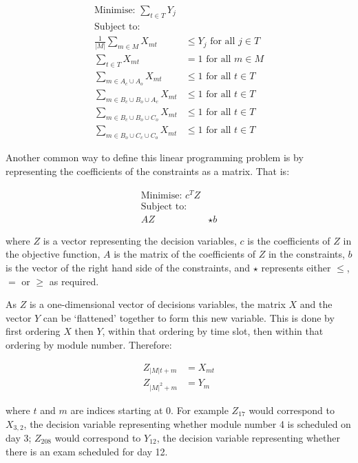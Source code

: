 \begin{align}
\text{Minimise: } \sum_{t \in T} Y_j & \label{eqn:objective_modules} \\
\text{Subject to: } & \nonumber \\
\frac{1}{|M|} \sum_{m \in M} X_{mt} &\leq Y_j \text{ for all } j \in T \label{eqn:auxiliary} \\
\sum_{t \in T} X_{mt} &= 1 \text{ for all } m \in M \label{eqn:schedule_all_modules} \\
\sum_{m \in A_c \cup A_o} X_{mt} &\leq 1 \text{ for all } t \in T \label{eqn:clique1} \\
\sum_{m \in B_c \cup B_o \cup A_c} X_{mt} &\leq 1 \text{ for all } t \in T \label{eqn:clique2} \\
\sum_{m \in B_c \cup B_o \cup C_o} X_{mt} &\leq 1 \text{ for all } t \in T \label{eqn:clique3} \\
\sum_{m \in B_o \cup C_c \cup C_o} X_{mt} &\leq 1 \text{ for all } t \in T \label{eqn:clique4}
\end{align}

Another common way to define this linear programming problem is by representing the
coefficients of the constraints as a matrix.
That is:

\begin{align}
\text{Minimise: } c^T Z & \\
\text{Subject to: } & \nonumber \\
A Z & \star b
\end{align}

where \(Z\) is a vector representing the decision variables, \(c\) is the
coefficients of \(Z\) in the objective function, \(A\) is the matrix of the
coefficients of \(Z\) in the constraints, \(b\) is the vector of the right hand
side of the constraints, and \(\star\) represents either \(\leq\), \(=\) or
\(\geq\) as required.

As \(Z\) is a one-dimensional vector of decisions variables,
the matrix \(X\) and the vector \(Y\) can be `flattened' together to form this new variable.
This is done by first ordering \(X\) then \(Y\), within that
ordering by time slot, then within that ordering by module number.
Therefore:

\begin{align}
Z_{|M|t + m} &= X_{mt}\\
Z_{|M|^2 + m} &= Y_m
\end{align}

where \(t\) and \(m\) are indices starting at 0.
For example \(Z_{17}\) would correspond to \(X_{3, 2}\), the decision variable
representing whether module number 4 is scheduled on day 3; \(Z_{208}\) would
correspond to \(Y_{12}\), the decision variable representing whether there is an
exam scheduled for day 12.

